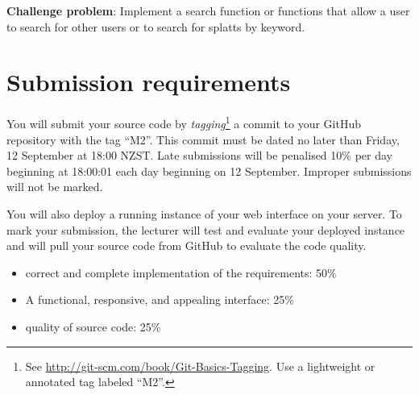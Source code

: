 \documentclass{article}
\begin{document}
\textbf{Challenge problem}: Implement a search function or functions that allow a user to search for other users or to search for splatts by keyword.

\section{Submission requirements}
  You will submit your source code by \emph{tagging}\footnote{See \url{http://git-scm.com/book/Git-Basics-Tagging}.  Use a lightweight or annotated tag labeled ``M2''.} a commit to your GitHub repository with the tag ``M2''.  This commit must be dated no later than Friday, 12 September at 18:00 NZST. Late submissions will be penalised 10\% per day beginning at 18:00:01 each day beginning on 12 September.  Improper submissions will not be marked.  

  You will also deploy a running instance of your web interface on your server.  To mark your submission, the lecturer will test and evaluate your deployed instance and will pull your source code from GitHub to evaluate the code quality.

\begin{itemize}
  \item correct and complete implementation of the requirements:  50\%
  \item A functional, responsive, and appealing interface: 25\%
  \item quality of source code: 25\%
\end{itemize}
\end{document}
